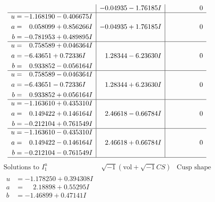 \documentclass[1p]{elsarticle_modified}
\theoremstyle{definition}
\newcommand{\I}{\sqrt{-1}}
\begin{document}
$$\begin{array}{c|c|c}
 & -0.04935 - 1.76185 I & \phantom{-0.000000 } 0 \\ \hline\begin{aligned}
u &= -1.168190 - 0.406675 I \\
a &= \phantom{-}0.058099 + 0.856266 I \\
b &= -0.781953 + 0.489895 I\end{aligned}
 & -0.04935 + 1.76185 I & \phantom{-0.000000 } 0 \\ \hline\begin{aligned}
u &= \phantom{-}0.758589 + 0.046364 I \\
a &= -6.43651 + 0.72336 I \\
b &= \phantom{-}0.933852 - 0.056164 I\end{aligned}
 & \phantom{-}1.28344 - 6.23630 I & \phantom{-0.000000 } 0 \\ \hline\begin{aligned}
u &= \phantom{-}0.758589 - 0.046364 I \\
a &= -6.43651 - 0.72336 I \\
b &= \phantom{-}0.933852 + 0.056164 I\end{aligned}
 & \phantom{-}1.28344 + 6.23630 I & \phantom{-0.000000 } 0 \\ \hline\begin{aligned}
u &= -1.163610 + 0.435310 I \\
a &= \phantom{-}0.149422 + 0.146164 I \\
b &= -0.212104 + 0.761549 I\end{aligned}
 & \phantom{-}2.46618 - 0.66784 I & \phantom{-0.000000 } 0 \\ \hline\begin{aligned}
u &= -1.163610 - 0.435310 I \\
a &= \phantom{-}0.149422 - 0.146164 I \\
b &= -0.212104 - 0.761549 I\end{aligned}
 & \phantom{-}2.46618 + 0.66784 I & \phantom{-0.000000 } 0\\
 \hline 
 \end{array}$$\newpage$$\begin{array}{c|c|c}  
\text{Solutions to }I^u_{1}& \I (\text{vol} + \sqrt{-1}CS) & \text{Cusp shape}\\
 \hline 
\begin{aligned}
u &= -1.178250 + 0.394308 I \\
a &= \phantom{-}2.18898 + 0.55295 I \\
b &= -1.46899 + 0.47141 I\end{aligned}

\end{array}$$
\end{document}
